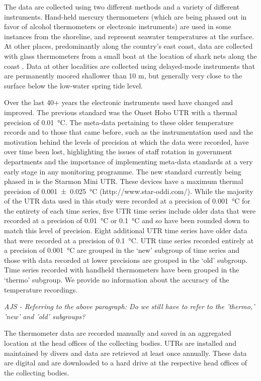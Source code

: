 \documentclass{ametsoc}
\begin{document}
The data are collected using two different methods and a variety of different instruments. Hand-held mercury thermometers (which are being phased out in favor of alcohol thermometers or electronic instruments) are used in some instances from the shoreline, and represent seawater temperatures at the surface. At other places, predominantly along the country's east coast, data are collected with glass thermometers from a small boat at the location of shark nets along the coast \citep{Cliff1988}. Data at other localities are collected using delayed-mode instruments that are permanently moored shallower than 10 m, but generally very close to the surface below the low-water spring tide level.

Over the last 40+ years the electronic instruments used have changed and improved. The previous standard was the Onset Hobo UTR with a thermal precision of \SI{0.01}{\degreeCelsius}. The meta-data pertaining to these older temperature records and to those that came before, such as the instrumentation used and the motivation behind the levels of precision at which the data were recorded, have over time been lost, highlighting the issues of staff rotation in government departments and the importance of implementing meta-data standards at a very early stage in any monitoring programme. The new standard currently being phased in is the Starmon Mini UTR. These devices have a maximum thermal precision of \SI[separate-uncertainty = true, multi-part-units = repeat]{0.001(25)}{\degreeCelsius} (http://www.star-oddi.com/). While the majority of the UTR data used in this study were recorded at a precision of \SI{0.001}{\degreeCelsius} for the entirety of each time series, five UTR time series include older data that were recorded at a precision of \SI{0.01}{\degreeCelsius} or \SI{0.1}{\degreeCelsius} and so have been rounded down to match this level of precision. Eight additional UTR time series have older data that were recorded at a precision of \SI{0.1}{\degreeCelsius}. UTR time series recorded entirely at a precision of \SI{0.001}{\degreeCelsius} are grouped in the `new' subgroup of time series and those with data recorded at lower precisions are grouped in the `old' subgroup. Time series recorded with handheld thermometers have been grouped in the `thermo' subgroup. We provide no information about the accuracy of the temperature recordings.

\emph{AJS - Referring to the above paragraph: Do we still have to refer to the 'thermo,' 'new' and 'old' subgroups?}

The thermometer data are recorded manually and saved in an aggregated location at the head offices of the collecting bodies. UTRs are installed and maintained by divers and data are retrieved at least once annually. These data are digital and are downloaded to a hard drive at the respective head offices of the collecting bodies.
\end{document}

